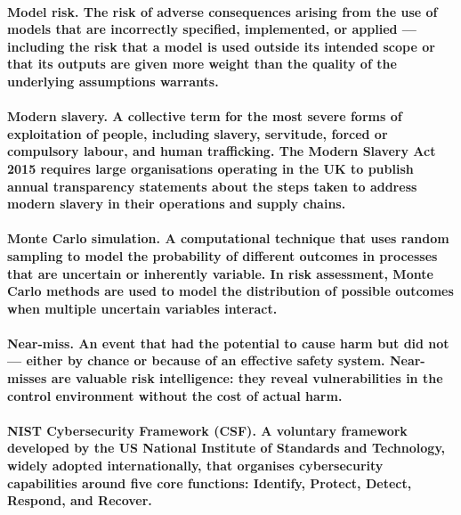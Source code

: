\paragraph{\textbf{Model risk}. The risk of adverse consequences arising from the use of models that are incorrectly specified, implemented, or applied — including the risk that a model is used outside its intended scope or that its outputs are given more weight than the quality of the underlying assumptions warrants.}

\paragraph{\textbf{Modern slavery}. A collective term for the most severe forms of exploitation of people, including slavery, servitude, forced or compulsory labour, and human trafficking. The Modern Slavery Act 2015 requires large organisations operating in the UK to publish annual transparency statements about the steps taken to address modern slavery in their operations and supply chains.}

\paragraph{\textbf{Monte Carlo simulation}. A computational technique that uses random sampling to model the probability of different outcomes in processes that are uncertain or inherently variable. In risk assessment, Monte Carlo methods are used to model the distribution of possible outcomes when multiple uncertain variables interact.}

\paragraph{\textbf{Near-miss}. An event that had the potential to cause harm but did not — either by chance or because of an effective safety system. Near-misses are valuable risk intelligence: they reveal vulnerabilities in the control environment without the cost of actual harm.}

\paragraph{\textbf{NIST Cybersecurity Framework (CSF)}. A voluntary framework developed by the US National Institute of Standards and Technology, widely adopted internationally, that organises cybersecurity capabilities around five core functions: Identify, Protect, Detect, Respond, and Recover.}


